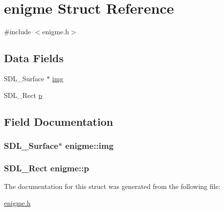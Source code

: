\hypertarget{structenigme}{}\section{enigme Struct Reference}
\label{structenigme}


{\ttfamily \#include $<$enigme.\+h$>$}

\subsection*{Data Fields}
\begin{DoxyCompactItemize}
\item 
S\+D\+L\+\_\+\+Surface $\ast$ \hyperlink{structenigme_ac5c2141e5f8c366ff16d1fad83ee3e54}{img}
\item 
S\+D\+L\+\_\+\+Rect \hyperlink{structenigme_a1ecc3fa572d2c308e1aecacf74fd1ec0}{p}
\end{DoxyCompactItemize}


\subsection{Field Documentation}
\subsubsection[{\texorpdfstring{img}{img}}]{\setlength{\rightskip}{0pt plus 5cm}S\+D\+L\+\_\+\+Surface$\ast$ enigme\+::img}\hypertarget{structenigme_ac5c2141e5f8c366ff16d1fad83ee3e54}{}\label{structenigme_ac5c2141e5f8c366ff16d1fad83ee3e54}
\subsubsection[{\texorpdfstring{p}{p}}]{\setlength{\rightskip}{0pt plus 5cm}S\+D\+L\+\_\+\+Rect enigme\+::p}\hypertarget{structenigme_a1ecc3fa572d2c308e1aecacf74fd1ec0}{}\label{structenigme_a1ecc3fa572d2c308e1aecacf74fd1ec0}


The documentation for this struct was generated from the following file\+:\begin{DoxyCompactItemize}
\item 
\hyperlink{enigme_8h}{enigme.\+h}\end{DoxyCompactItemize}
